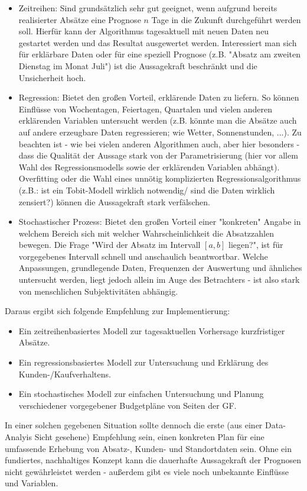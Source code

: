 \documentclass[a4paper,11pt]{article}
\begin{document}
\begin{itemize}
	\item Zeitreihen: Sind grundsätzlich sehr gut geeignet, wenn aufgrund bereits realisierter Absätze eine Prognose $n$ Tage in die Zukunft durchgeführt werden soll. Hierfür kann der Algorithmus tagesaktuell mit neuen Daten neu gestartet werden und das Resultat ausgewertet werden. Interessiert man sich für erklärbare Daten oder für eine speziell Prognose (z.B. "Absatz am zweiten Dienstag im Monat Juli") ist die Aussagekraft beschränkt und die Unsicherheit hoch.
	\item Regression: Bietet den großen Vorteil, erklärende Daten zu liefern. So können Einflüsse von Wochentagen, Feiertagen, Quartalen und vielen anderen erklärenden Variablen untersucht werden (z.B. könnte man die Absätze auch auf andere erzeugbare Daten regressieren; wie Wetter, Sonnenstunden, ...). Zu beachten ist - wie bei vielen anderen Algorithmen auch, aber hier besonders - dass die Qualität der Aussage stark von der Parametrisierung (hier vor allem Wahl des Regressionsmodells sowie der erklärenden Variablen abhängt). Overfitting oder die Wahl eines unnötig komplizierten Regressionsalgorithmus (z.B.: ist ein Tobit-Modell wirklich notwendig/ sind die Daten wirklich zensiert?) können die Aussagekraft stark verfälschen.
	\item Stochastischer Prozess: Bietet den großen Vorteil einer "konkreten" Angabe in welchem Bereich sich mit welcher Wahrscheinlichkeit die Absatzzahlen bewegen. Die Frage "Wird der Absatz im Intervall $[a,b]$ liegen?", ist für vorgegebenes Intervall schnell und anschaulich beantwortbar. Welche Anpassungen, grundlegende Daten, Frequenzen der Auswertung und ähnliches untersucht werden, liegt jedoch allein im Auge des Betrachters - ist also stark von menschlichen Subjektivitäten abhängig.
\end{itemize}

Daraus ergibt sich folgende Empfehlung zur Implementierung:
\begin{itemize}
	\item Ein zeitreihenbasiertes Modell zur tagesaktuellen Vorhersage kurzfristiger Absätze.
	\item Ein regressionsbasiertes Modell zur Untersuchung und Erklärung des Kunden-/Kaufverhaltens.
	\item Ein stochastisches Modell zur einfachen Untersuchung und Planung verschiedener vorgegebener Budgetpläne von Seiten der GF.
\end{itemize}

In einer solchen gegebenen Situation sollte dennoch die erste (aus einer Data-Analyis Sicht gesehene) Empfehlung sein, einen konkreten Plan für eine umfassende Erhebung von Absatz-, Kunden- und Standortdaten sein. Ohne ein fundiertes, nachhaltiges Konzept kann die dauerhafte Aussagekraft der Prognosen nicht gewährleistet werden - außerdem gibt es viele noch unbekannte Einflüsse und Variablen.


\newpage


\end{document}
